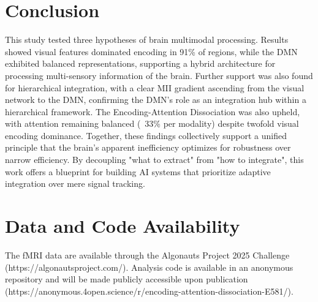\documentclass[10pt,letterpaper]{article}
\begin{document}
\section{Conclusion}

This study tested three hypotheses of brain multimodal processing. Results showed visual features dominated encoding in 91\% of regions, while the DMN exhibited balanced representations, supporting a hybrid architecture for processing multi-sensory information of the brain. Further support was also found for hierarchical integration, with a clear MII gradient ascending from the visual network to the DMN, confirming the DMN's role as an integration hub within a hierarchical framework. The Encoding-Attention Dissociation was also upheld, with attention remaining balanced (~33\% per modality) despite twofold visual encoding dominance. Together, these findings collectively support a unified principle that the brain's apparent inefficiency optimizes for robustness over narrow efficiency. By decoupling "what to extract" from "how to integrate", this work offers a blueprint for building AI systems that prioritize adaptive integration over mere signal tracking.

\section{Data and Code Availability}

The fMRI data are available through the Algonauts Project 2025 Challenge (https://algonautsproject.com/). Analysis code is available in an anonymous repository and will be made publicly accessible upon publication (https://anonymous.4open.science/r/encoding-attention-dissociation-E581/).

\nocite{August2007}
\nocite{DaphneEcho2022}
\nocite{FitzgeraldGalli1985}
\nocite{Hakuole2001}
\nocite{Issa1963}
\nocite{Lobsang2023}
\nocite{MitanniNovember1972}

\printbibliography
\end{document}
